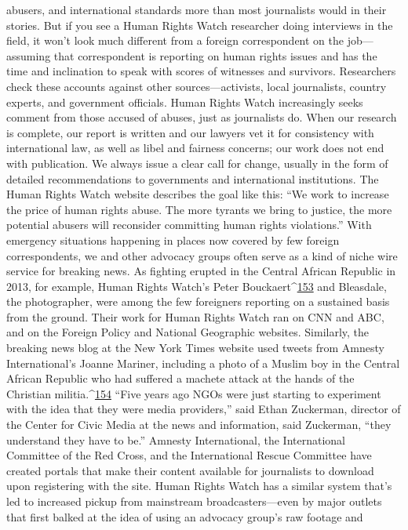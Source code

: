 abusers, and international standards more than most journalists would in their stories.
But if you see a Human Rights Watch researcher doing interviews in the field, it won’t
look much different from a foreign correspondent on the job—assuming that
correspondent is reporting on human rights issues and has the time and inclination to
speak with scores of witnesses and survivors. Researchers check these accounts against
other sources—activists, local journalists, country experts, and government officials.
Human Rights Watch increasingly seeks comment from those accused of abuses, just as
journalists do.
When our research is complete, our report is written and our lawyers vet it for
consistency with international law, as well as libel and fairness concerns; our work does
not end with publication. We always issue a clear call for change, usually in the form of
detailed recommendations to governments and international institutions. The Human
Rights Watch website describes the goal like this: ``We work to increase the price of
human rights abuse. The more tyrants we bring to justice, the more potential abusers will
reconsider committing human rights violations.''
With emergency situations happening in places now covered by few foreign
correspondents, we and other advocacy groups often serve as a kind of niche wire service
for breaking news. As fighting erupted in the Central African Republic in 2013, for
example, Human Rights Watch’s Peter Bouckaert^{\href{#endnotes}{153}} and Bleasdale, the photographer,
were among the few foreigners reporting on a sustained basis from the ground. Their
work for Human Rights Watch ran on CNN and ABC, and on the Foreign Policy and
National Geographic websites. Similarly, the breaking news blog at the New York Times
website used tweets from Amnesty International’s Joanne Mariner, including a photo of a
Muslim boy in the Central African Republic who had suffered a machete attack at the
hands of the Christian militia.^{\href{#endnotes}{154}}
``Five years ago NGOs were just starting to experiment with the idea that they were
media providers,'' said Ethan Zuckerman, director of the Center for Civic Media at the
news and information, said Zuckerman, ``they understand they have to be.''
Amnesty International, the International Committee of the Red Cross, and the
International Rescue Committee have created portals that make their content available for
journalists to download upon registering with the site. Human Rights Watch has a similar
system that’s led to increased pickup from mainstream broadcasters—even by major
outlets that first balked at the idea of using an advocacy group’s raw footage and
